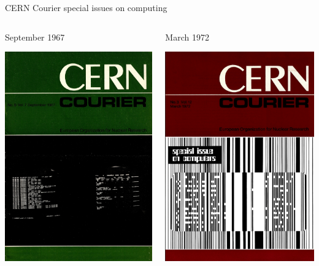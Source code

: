\documentclass[aspectratio=169]{beamer}
\begin{document}
\begin{frame}{CERN Courier special issues on computing}
\large
\begin{columns}
\begin{center}
September 1967

\vspace{0.2 cm}
\includegraphics[width=0.55\linewidth]{PLOTS/cern-courier-1.png}

\vspace{0.5 cm}
\end{center}

\begin{center}
March 1972

\vspace{0.2 cm}
\includegraphics[width=0.55\linewidth]{PLOTS/cern-courier-2.png}

\vspace{0.5 cm}
\end{center}
\end{columns}
\end{frame}
\end{document}
